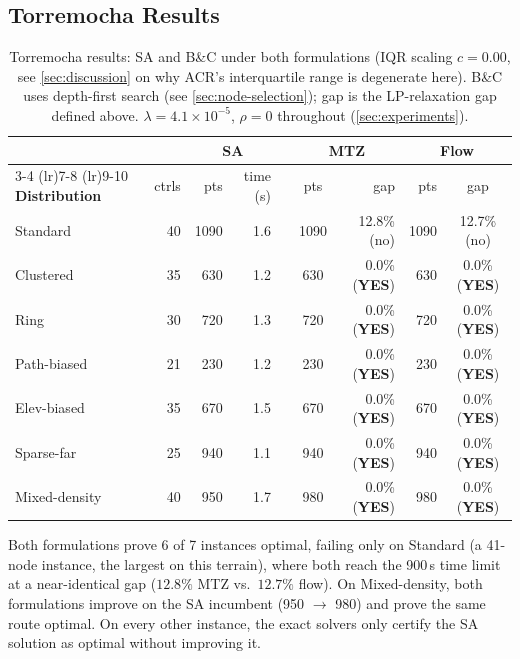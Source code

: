 \documentclass[11pt,a4paper]{article}
\begin{document}
\subsection{Torremocha Results}

\begin{table}[H]
\centering
\caption{Torremocha results: SA and B\&C under both formulations (IQR scaling $c = 0.00$, see \cref{sec:discussion} on why ACR's interquartile range is degenerate here). B\&C uses depth-first search (see \cref{sec:node-selection}); gap is the LP-relaxation gap defined above. $\lambda = 4.1\times10^{-5}$, $\rho = 0$ throughout (\cref{sec:experiments}).}
\label{tab:torremocha}
\begin{tabular}{lrrrrrcrrc}
\toprule
& & \multicolumn{2}{c}{\textbf{SA}} & \multicolumn{2}{c}{\phantom{x}} & \multicolumn{2}{c}{\textbf{MTZ}} & \multicolumn{2}{c}{\textbf{Flow}} \\
\cmidrule(lr){3-4} \cmidrule(lr){7-8} \cmidrule(lr){9-10}
\textbf{Distribution} & ctrls & pts & time (s) & \multicolumn{2}{c}{} & pts & gap & pts & gap \\
\midrule
Standard        & 40 & 1090 & 1.6 & \multicolumn{2}{c}{} & 1090 & 12.8\% (no) & 1090 & 12.7\% (no) \\
Clustered       & 35 &  630 & 1.2 & \multicolumn{2}{c}{} &  630 &  0.0\% (\textbf{YES}) &  630 &  0.0\% (\textbf{YES}) \\
Ring            & 30 &  720 & 1.3 & \multicolumn{2}{c}{} &  720 &  0.0\% (\textbf{YES}) &  720 &  0.0\% (\textbf{YES}) \\
Path-biased     & 21 &  230 & 1.2 & \multicolumn{2}{c}{} &  230 &  0.0\% (\textbf{YES}) &  230 &  0.0\% (\textbf{YES}) \\
Elev-biased     & 35 &  670 & 1.5 & \multicolumn{2}{c}{} &  670 &  0.0\% (\textbf{YES}) &  670 &  0.0\% (\textbf{YES}) \\
Sparse-far      & 25 &  940 & 1.1 & \multicolumn{2}{c}{} &  940 &  0.0\% (\textbf{YES}) &  940 &  0.0\% (\textbf{YES}) \\
Mixed-density   & 40 &  950 & 1.7 & \multicolumn{2}{c}{} &  980 &  0.0\% (\textbf{YES}) &  980 &  0.0\% (\textbf{YES}) \\
\bottomrule
\end{tabular}
\end{table}

Both formulations prove 6 of 7 instances optimal, failing only on Standard (a 41-node instance, the largest on this terrain), where both reach the 900\,s time limit at a near-identical gap ($12.8\%$ MTZ vs.\ $12.7\%$ flow).
On Mixed-density, both formulations improve on the SA incumbent (950 $\to$ 980) and prove the same route optimal.
On every other instance, the exact solvers only certify the SA solution as optimal without improving it.
\end{document}

